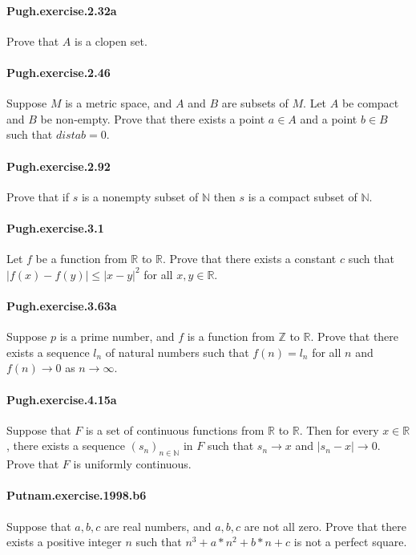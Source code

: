 \documentclass{article}
\begin{document}
\paragraph{Pugh.exercise.2.32a} Prove that $A$ is a clopen set.

\paragraph{Pugh.exercise.2.46} Suppose $M$ is a metric space, and $A$ and $B$ are subsets of $M$. Let $A$ be compact and $B$ be non-empty. Prove that there exists a point $a \in A$ and a point $b \in B$ such that $dist a b = 0$.

\paragraph{Pugh.exercise.2.92} Prove that if $s$ is a nonempty subset of $\mathbb{N}$ then $s$ is a compact subset of $\mathbb{N}$.

\paragraph{Pugh.exercise.3.1} Let $f$ be a function from $\mathbb{R}$ to $\mathbb{R}$. Prove that there exists a constant $c$ such that $|f(x) - f(y)| ≤ |x - y| ^ 2$ for all $x, y \in \mathbb{R}$.

\paragraph{Pugh.exercise.3.63a} Suppose $p$ is a prime number, and $f$ is a function from $\mathbb{Z}$ to $\mathbb{R}$. Prove that there exists a sequence $l_n$ of natural numbers such that $f(n) = l_n$ for all $n$ and $f(n) \to 0$ as $n \to \infty$.

\paragraph{Pugh.exercise.4.15a} Suppose that $F$ is a set of continuous functions from $\mathbb{R}$ to $\mathbb{R}$. Then for every $x \in \mathbb{R}$, there exists a sequence $(s_n)_{n \in \mathbb{N}}$ in $F$ such that $s_n \to x$ and $|s_n - x| \to 0$. Prove that $F$ is uniformly continuous.

\paragraph{Putnam.exercise.1998.b6} Suppose that $a, b, c$ are real numbers, and $a, b, c$ are not all zero. Prove that there exists a positive integer $n$ such that $n^3 + a*n^2 + b*n + c$ is not a perfect square.
\end{document}
